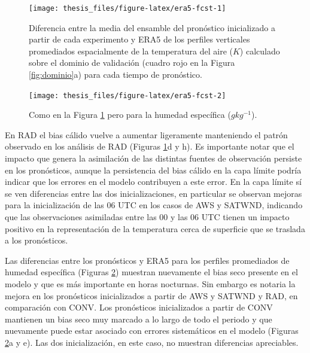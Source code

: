 \documentclass[12pt,oneside,a4paper]{reedthesis}
\begin{document}
\begin{figure}[ht]

{\centering \texttt{[image: thesis\_files/figure-latex/era5-fcst-1]} 

}

\caption{Diferencia entre la media del ensamble del pronóstico inicializado a partir de cada experimento y ERA5 de los perfiles verticales promediados espacialmente de la temperatura del aire (\(K\)) calculado sobre el dominio de validación (cuadro rojo en la Figura \ref{fig:dominio}a) para cada tiempo de pronóstico.}\label{fig:era5-fcst-1}
\end{figure}
\begin{figure}[ht]

{\centering \texttt{[image: thesis\_files/figure-latex/era5-fcst-2]} 

}

\caption{Como en la Figura \ref{fig:era5-fcst-1} pero para la humedad específica (\(gkg^{-1}\)).}\label{fig:era5-fcst-2}
\end{figure}
En RAD el bias cálido vuelve a aumentar ligeramente manteniendo el patrón observado en los análisis de RAD (Figuras \ref{fig:era5-fcst-1}d y h). Es importante notar que el impacto que genera la asimilación de las distintas fuentes de observación persiste en los pronósticos, aunque la persistencia del bias cálido en la capa límite podría indicar que los errores en el modelo contribuyen a este error. En la capa límite sí se ven diferencias entre las dos inicializaciones, en particular se observan mejoras para la inicialización de las 06 UTC en los casos de AWS y SATWND, indicando que las observaciones asimiladas entre las 00 y las 06 UTC tienen un impacto positivo en la representación de la temperatura cerca de superficie que se traslada a los pronósticos.

Las diferencias entre los pronósticos y ERA5 para los perfiles promediados de humedad específica (Figuras \ref{fig:era5-fcst-2}) muestran nuevamente el bias seco presente en el modelo y que es más importante en horas nocturnas. Sin embargo es notaria la mejora en los pronósticos inicializados a partir de AWS y SATWND y RAD, en comparación con CONV. Los pronósticos inicializados a partir de CONV mantienen un bias seco muy marcado a lo largo de todo el periodo y que nuevamente puede estar asociado con errores sistemáticos en el modelo (Figuras \ref{fig:era5-fcst-2}a y e). Las dos inicialización, en este caso, no muestran diferencias apreciables.
\end{document}
